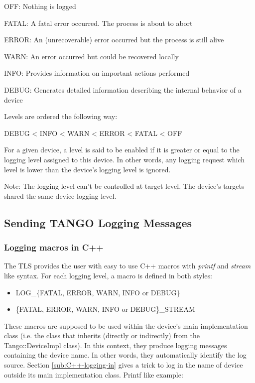 OFF: Nothing is logged

FATAL: A fatal error occurred. The process is about to abort

ERROR: An (unrecoverable) error occurred but the process is still
alive

WARN: An error occurred but could be recovered locally

INFO: Provides information on important actions performed

DEBUG: Generates detailed information describing the internal behavior
of a device

Levels are ordered the following way: \begin{center}DEBUG < INFO
< WARN < ERROR < FATAL < OFF\end{center}

For a given device, a level is said to be enabled if it is greater
or equal to the logging level assigned to this device. In other words,
any logging request which level is lower than the device's logging
level is ignored. 

Note: The logging level can't be controlled at target level. The device's
targets shared the same device logging level.


\subsection{Sending TANGO Logging Messages}


\subsubsection{Logging macros in C++}

The TLS provides the user with easy to use C++ macros with \emph{printf}
and \emph{stream} like syntax. For each logging level, a macro is
defined in both styles:
\begin{itemize}
\item LOG\_\{FATAL, ERROR, WARN, INFO or DEBUG\}
\item \{FATAL, ERROR, WARN, INFO or DEBUG\}\_STREAM
\end{itemize}
These macros are supposed to be used within the device's main implementation
class (i.e. the class that inherits (directly or indirectly) from
the Tango::DeviceImpl class). In this context, they produce logging
messages containing the device name. In other words, they automatically
identify the log source. Section \ref{sub:C++-logging-in} gives a
trick to log in the name of device outside its main implementation
class. Printf like example:



